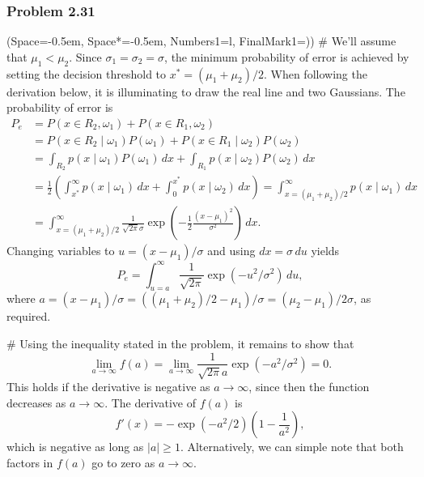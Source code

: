 \documentclass[12pt, a4paper]{article}
\newcommand{\listSpace}{-0.5em}%
\newcommand{\abs}[1]{\left\lvert#1\right\rvert}
\begin{document}
\subsubsection*{Problem 2.31}
\begin{easylist}[enumerate]
\ListProperties(Space=\listSpace, Space*=\listSpace, Numbers1=l, FinalMark1={)})
# We'll assume that $\mu_1 < \mu_2$.
Since $\sigma_1 = \sigma_2 = \sigma$, the minimum probability of error is achieved by setting the decision threshold to $x^* = (\mu_1 + \mu_2)/2$.
When following the derivation below, it is illuminating to draw the real line and two Gaussians.
The probability of error is
\begin{align*}
	P_e &= P(x \in R_2, \omega_1) + P(x \in R_1, \omega_2) \\
	&= 
	P(x \in R_2  \mid  \omega_1) P(\omega_1)  + P(x \in R_1  \mid  \omega_2) P(\omega_2) \\&= 
	\int_{R_2} p(x  \mid  \omega_1) P(\omega_1) \, dx + \int_{R_1} p(x  \mid  \omega_2) P(\omega_2) \, dx
	 \\
	 &= \frac{1}{2}\left( \int_{x^*}^{\infty} p(x  \mid  \omega_1) \, dx + 
	 \int_{0}^{x^*} p(x  \mid  \omega_2) \, dx \right) = \int_{x =(\mu_1 + \mu_2)/2 }^{\infty} p(x  \mid  \omega_1) \, dx \\
	 &=
	 \int_{x =(\mu_1 + \mu_2)/2 }^{\infty} \frac{1}{\sqrt{2 \pi } \sigma} \exp\left( - \frac{1}{2} \frac{(x - \mu_1)^2}{\sigma^2}\right) \, dx.
\end{align*}
Changing variables to $u = (x - \mu_1) / \sigma$ and using $dx = \sigma \, du$ yields
\begin{equation*}
	P_e = \int_{u=a}^{\infty} \frac{1}{\sqrt{2 \pi }} \exp\left( -u^2 /\sigma^2 \right) \, du,
\end{equation*}
where $a = (x - \mu_1 )/\sigma = ((\mu_1 + \mu_2)/2 - \mu_1 )/\sigma =  (\mu_2 - \mu_1) / 2 \sigma$, as required.

# Using the inequality stated in the problem, it remains to show that
\begin{equation*}
	\lim_{a \to \infty} f(a) = \lim_{a \to \infty} \frac{1}{\sqrt{2 \pi} a} \exp\left( -a^2 /\sigma^2 \right) = 0.
\end{equation*}
This holds if the derivative is negative as $a \to \infty$, since then the function decreases as $a \to \infty$. The derivative of $f(a)$ is
\begin{equation*}
	f'(x) = -\exp\left( -a^2 / 2\right) \left( 1 - \frac{1}{a^2}\right),
\end{equation*}
which is negative as long as $\abs{a} \geq 1$.
Alternatively, we can simple note that both factors in $f(a)$ go to zero as $a \to \infty$.
\end{easylist}
\end{document}
